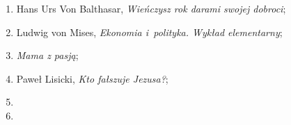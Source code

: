\documentclass[a4paper,11pt]{article}
\begin{document}
\begin{enumerate}
\item Hans Urs Von Balthasar, \textit{Wieńczysz rok darami swojej dobroci};

\item Ludwig von Mises, \textit{Ekonomia i~polityka. Wykład elementarny};

\item \textit{Mama z pasją};

\item Paweł Lisicki, \textit{Kto fałszuje Jezusa?};

\item

\item












































































































\end{enumerate}

% 












\end{document}
